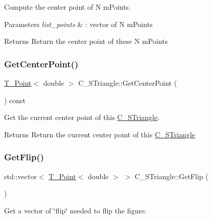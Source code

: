 Compute the center point of N m\+Points. 


\begin{DoxyParams}{Parameters}
{\em list\+\_\+points} & \+: vector of N m\+Points \\
\hline
\end{DoxyParams}
\begin{DoxyReturn}{Returns}
Return the center point of these N m\+Points 
\end{DoxyReturn}
\mbox{\label{classC__STriangle_a8b146612f33e3d2e8f6f218be1499a13}} 
\subsubsection{\texorpdfstring{Get\+Center\+Point()}{GetCenterPoint()}}
{\footnotesize\ttfamily \hyperlink{classT__Point}{T\+\_\+\+Point}$<$ double $>$ C\+\_\+\+S\+Triangle\+::\+Get\+Center\+Point (\begin{DoxyParamCaption}{ }\end{DoxyParamCaption}) const}



Get the current center point of this \hyperlink{classC__STriangle}{C\+\_\+\+S\+Triangle}. 

\begin{DoxyReturn}{Returns}
Return the current center point of this \hyperlink{classC__STriangle}{C\+\_\+\+S\+Triangle} 
\end{DoxyReturn}
\mbox{\label{classC__STriangle_a92550826ba2d9866f2cb01b66abfbebc}} 
\subsubsection{\texorpdfstring{Get\+Flip()}{GetFlip()}}
{\footnotesize\ttfamily std\+::vector$<$ \hyperlink{classT__Point}{T\+\_\+\+Point}$<$ double $>$ $>$ C\+\_\+\+S\+Triangle\+::\+Get\+Flip (\begin{DoxyParamCaption}{ }\end{DoxyParamCaption})}



Get a vector of \char`\"{}flip\char`\"{} needed to flip the figure. 


